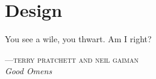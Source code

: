 %
%

\chapter{Design}
\epigraph{You see a wile, you thwart. Am I right?}{\textsc{---terry 
pratchett and neil gaiman}\\\textit{Good Omens}}


